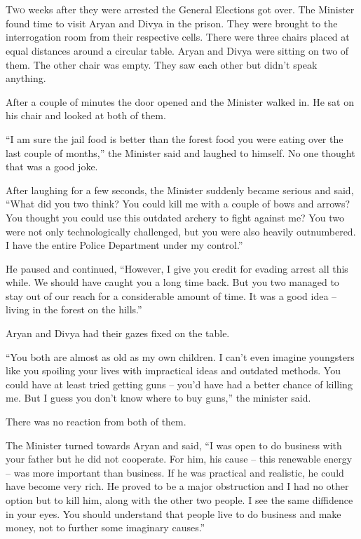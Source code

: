 \chapter{}

\lettrine{T}{wo} weeks after they were arrested the General Elections got over. The Minister
found time to visit Aryan and Divya in the prison. They were brought to the
interrogation room from their respective cells. There were three chairs placed
at equal distances around a circular table. Aryan and Divya were sitting on two
of them. The other chair was empty. They saw each other but didn't speak
anything.

After a couple of minutes the door opened and the Minister walked in. He sat on
his chair and looked at both of them.

“I am sure the jail food is better than the forest food you were eating over the
last couple of months,” the Minister said and laughed to himself. No one thought
that was a good joke.

After laughing for a few seconds, the Minister suddenly became serious and said,
“What did you two think? You could kill me with a couple of bows and arrows? You
thought you could use this outdated archery to fight against me? You two were
not only technologically challenged, but you were also heavily outnumbered. I
have the entire Police Department under my control.”

He paused and continued, “However, I give you credit for evading arrest all this
while. We should have caught you a long time back. But you two managed to stay
out of our reach for a considerable amount of time. It was a good idea – living
in the forest on the hills.”

Aryan and Divya had their gazes fixed on the table.

“You both are almost as old as my own children. I can't even imagine youngsters
like you spoiling your lives with impractical ideas and outdated methods. You
could have at least tried getting guns – you'd have had a better chance of
killing me. But I guess you don't know where to buy guns,” the minister said.

There was no reaction from both of them.

The Minister turned towards Aryan and said, “I was open to do business with your
father but he did not cooperate. For him, his cause – this renewable energy –
was more important than business. If he was practical and realistic, he could
have become very rich. He proved to be a major obstruction and I had no other
option but to kill him, along with the other two people. I see the same
diffidence in your eyes. You should understand that people live to do business
and make money, not to further some imaginary causes.”

